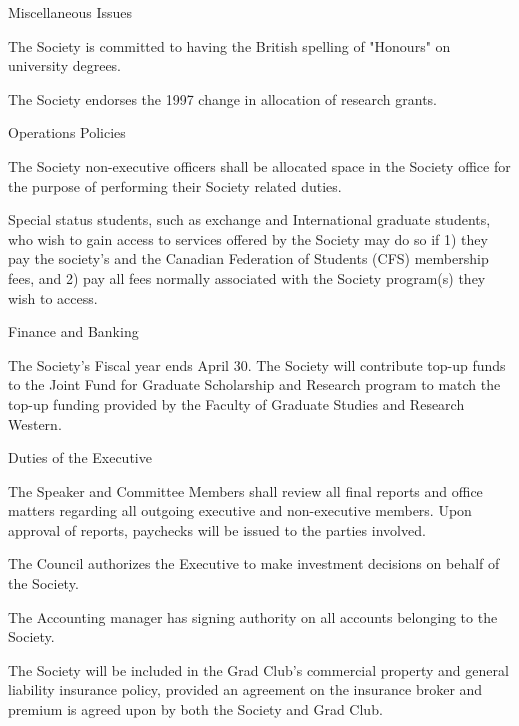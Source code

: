 \begin{longenum}[label*=\thesection.\arabic*., align=left]
\begin{longenum}[label*=\arabic*., align=left]
\begin{longenum}[label*=\arabic*., align=left]
\end{longenum}
\item Miscellaneous Issues
\begin{longenum}[label*=\arabic*., align=left]
\item The Society is committed to having the British spelling of "Honours" on university degrees.
\item The Society endorses the 1997 change in allocation of research grants.
\end{longenum}
\item Operations Policies
\begin{longenum}[label*=\arabic*., align=left]
\item The Society non-executive officers shall be allocated space in the Society office for the purpose of performing their Society related duties.
\item Special status students, such as exchange and International graduate students, who wish to gain access to services offered by the Society may do so if 1) they pay the society's and the Canadian Federation of Students (CFS) membership fees, and 2) pay all fees normally associated with the Society program(s) they wish to access.
\end{longenum}
Finance and Banking
\begin{longenum}[label*=\arabic*., align=left]
\item The Society's Fiscal year ends April 30.
The Society will contribute top-up funds to the Joint Fund for Graduate Scholarship and Research program to match the top-up funding provided by the Faculty of Graduate Studies and Research Western.
\end{longenum}
\item Duties of the Executive
\begin{longenum}[label*=\arabic*., align=left]
\item The Speaker and Committee Members shall review all final reports and office matters regarding all outgoing executive and non-executive members. Upon approval of reports, paychecks will be issued to the parties involved.
\item The Council authorizes the Executive to make investment decisions on behalf of the Society.
\item The Accounting manager has signing authority on all accounts belonging to the Society.
\item The Society will be included in the Grad Club's commercial property and general liability insurance policy, provided an agreement on the insurance broker and premium is agreed upon by both the Society and Grad Club.

\end{longenum}
\end{longenum}
\end{longenum}
